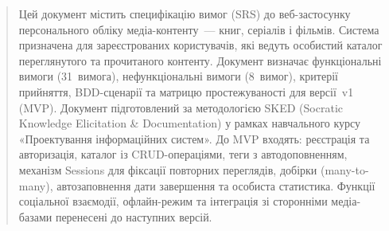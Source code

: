 \documentclass[profile=dstu,lang=uk]{skedreport}
\begin{document}
\skedmaketitle

\begin{abstract}
Цей документ містить специфікацію вимог (SRS) до веб-застосунку персонального обліку медіа-контенту~--- книг, серіалів і фільмів. Система призначена для зареєстрованих користувачів, які ведуть особистий каталог переглянутого та прочитаного контенту. Документ визначає функціональні вимоги (31~вимога), нефункціональні вимоги (8~вимог), критерії прийняття, BDD-сценарії та матрицю простежуваності для версії~v1 (MVP). Документ підготовлений за методологією SKED (Socratic Knowledge Elicitation \& Documentation) у рамках навчального курсу «Проектування інформаційних систем». До MVP входять: реєстрація та авторизація, каталог із CRUD-операціями, теги з автодоповненням, механізм Sessions для фіксації повторних переглядів, добірки (many-to-many), автозаповнення дати завершення та особиста статистика. Функції соціальної взаємодії, офлайн-режим та інтеграція зі сторонніми медіа-базами перенесені до наступних версій.
\end{abstract}

\skedtoc











\skedappendix



\skedbibliography
\end{document}
